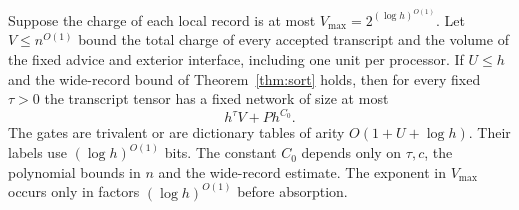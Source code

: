 \begin{lemma}\label{lem:fixed-transcript}
Suppose the charge of each local record is at most
$V_{\max}=2^{(\log h)^{O(1)}}$. Let $V\le n^{O(1)}$ bound the total
charge of every accepted transcript and the volume of the fixed
advice and exterior interface, including one unit per processor. If
$U\le h$ and the wide-record bound of Theorem~\ref{thm:sort} holds,
then for every fixed $\tau>0$ the transcript tensor has a fixed
network of size at most
\[
                          h^\tau V+P h^{C_0}.
\]
The gates are trivalent or are dictionary tables of arity
$O(1+U+\log h)$. Their labels use $(\log h)^{O(1)}$ bits. The
constant $C_0$ depends only on $\tau,c$, the polynomial bounds in $n$
and the wide-record estimate. The exponent in $V_{\max}$ occurs only
in factors $(\log h)^{O(1)}$ before absorption.
\end{lemma}

